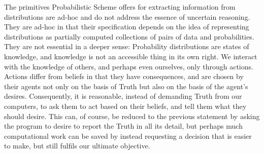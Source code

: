 \documentclass[12pt]{article}
\begin{document}
The primitives Probabilistic Scheme offers for extracting
information from distributions are ad-hoc and do not address the
essence of uncertain reasoning.  They are ad-hoc in that their
specification depends on the idea of representing distributions as
partially computed collections of pairs of data and probabilities.
They are not essential in a deeper sense: Probability distributions
are states of knowledge, and knowledge is not an accessible thing in
its own right.  We interact with the knowledge of others, and perhaps
even ourselves, only through actions.  Actions differ from beliefs in
that they have consequences, and are chosen by their agents not only
on the basis of Truth but also on the basis of the agent's desires.
Consequently, it is reasonable, instead of demanding Truth from our
computers, to ask them to act based on their beliefs, and tell them
what they should desire.  This can, of course, be reduced to the
previous statement by asking the program to desire to report the Truth
in all its detail, but perhaps much computational work can be saved by
instead requesting a decision that is easier to make, but still
fulfils our ultimate objective.
\end{document}
